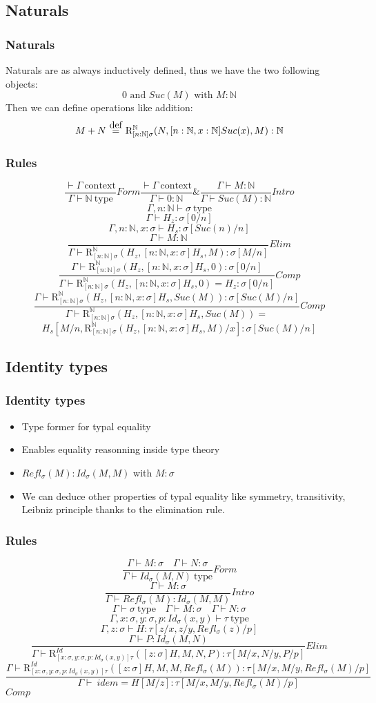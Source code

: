\documentclass{beamer}
\newcommand{\cntxt}{\ \mathrm{context}}
\newcommand{\typ}{\ \mathrm{type}}
\newcommand{\N}{\mathbb{N}}
\newcommand{\RN}[3]{\mathrm{R}_{[n: \N]\sigma}^{\N}(#1, #2, #3)}
\newcommand{\C}{Comp}
\newcommand{\Intro}{Intro}
\newcommand{\F}{Form}
\newcommand{\E}{Elim}
\newcommand\defeq{\stackrel{\mathclap{\normalfont\mbox{def}}}{\ =\ }}
\newcommand{\Id}[2]{Id_\sigma(#1,#2)}
\newcommand{\Refl}[1]{Refl_\sigma(#1)}
\newcommand{\RID}[4]{\mathrm{R}_{[x:\sigma,y:\sigma,p:Id_\sigma(x,y)]\tau}^{Id}(#1, #2, #3, #4)}
\newcommand{\bn}{[n:\N,x:\sigma]}
\newcommand{\bi}{[z:\sigma]}
\begin{document}
    \subsection{Naturals}
    \begin{frame}
        \frametitle{Naturals}
        Naturals are as always inductively defined, thus we have the two following objects:
        $$0 \text{ and } Suc(M) \text{ with } M:\N$$
        \vspace{10pt}
        Then we can define operations like addition:
        $$M + N \defeq \RN{N}{[n:\N, x:\N]Suc(x)}{M}:\N$$
    \end{frame}
    \begin{frame}
        \frametitle{Rules}
        $$\frac{\vdash \Gamma \cntxt}{\Gamma \vdash \N \typ}\F \frac{\vdash \Gamma \cntxt}{\Gamma \vdash 0 : \N}\& \frac{\Gamma \vdash M : \N}{\Gamma \vdash Suc(M):\N}\Intro$$
        $$\Gamma,n:\N\vdash\sigma\typ$$
        $$\Gamma\vdash H_z : \sigma[0/n]$$
        $$\Gamma,n:\N,x:\sigma\vdash H_s : \sigma[Suc(n)/n]$$
        $$\frac{\Gamma\vdash M: \N}{\Gamma\vdash\RN{H_z}{[n:\N,x:\sigma]H_s}{M}:\sigma[M/n]}\E$$
        $$\frac{\Gamma \vdash \RN{H_z}{\bn H_s}{0} : \sigma[0/n]}{\Gamma \vdash \RN{H_z}{\bn H_s}{0} = H_z: \sigma[0/n]}\C$$
        $$\frac{\Gamma \vdash \RN{H_z}{\bn H_s}{Suc(M)} : \sigma[Suc(M)/n]}{\Gamma \vdash \RN{H_z}{\bn H_s}{Suc(M)} =}\C$$
        $$ H_s[M/n,\RN{H_z}{\bn H_s}{M}/x]:\sigma[Suc(M)/n]$$
    \end{frame}
    \subsection{Identity types}
    \begin{frame}
        \frametitle{Identity types}
        \begin{itemize}
            \item Type former for typal equality
            \item Enables equality reasonning inside type theory
            \item $\Refl{M} : \Id{M}{M}$ with $M : \sigma$
            \item We can deduce other properties of typal equality like symmetry, transitivity, Leibniz principle thanks to the elimination rule.
        \end{itemize}
    \end{frame}
    \begin{frame}
        \frametitle{Rules}
        $$\frac{\Gamma\vdash M:\sigma \quad \Gamma\vdash N:\sigma}{\Gamma \vdash \Id{M}{N} \typ}\F$$
        $$\frac{\Gamma\vdash M:\sigma}{\Gamma\vdash\Refl{M}:\Id{M}{M}}\Intro$$
        $$\Gamma\vdash\sigma\typ\quad\Gamma\vdash M:\sigma\quad\Gamma\vdash N:\sigma$$
        $$\Gamma, x:\sigma,y:\sigma,p:\Id{x}{y}\vdash\tau\typ$$
        $$\Gamma,z:\sigma\vdash H:\tau[z/x,z/y,\Refl{z}/p]$$
        $$\frac{\Gamma\vdash P:\Id{M}{N}}{\Gamma\vdash\RID{[z:\sigma]H}{M}{N}{P}:\tau[M/x,N/y,P/p]}\E$$
        $$\frac{\Gamma \vdash \RID{\bi H}{M}{M}{\Refl{M}}:\tau[M/x,M/y,\Refl{M}/p]}{\Gamma \vdash\ idem = H[M/z]:\tau[M/x,M/y,\Refl{M}/p]}$$$\C$
    \end{frame}
\end{document}
